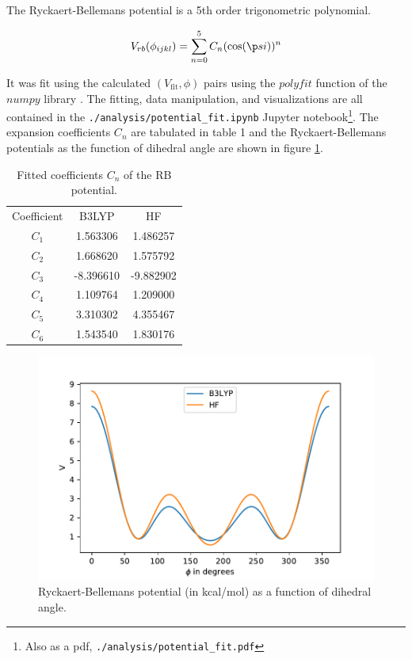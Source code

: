 \documentclass[10pt]{article}
\begin{document}
The Ryckaert-Bellemans potential is a 5th order trigonometric polynomial. 

\begin{align}
V_{rb}(\phi_{ijkl}) = \sum_{n=0}^5 C_n (\cos (\p si))^n
\end{align}

It was fit using the calculated $(V_{\text{fit}}, \phi)$ pairs using the $polyfit$ function of the $numpy$ library \cite{numpy}. The fitting, data manipulation, and visualizations are all contained in the \texttt{./analysis/potential\_fit.ipynb} Jupyter notebook\footnote{Also as a pdf, \texttt{\texttt{./analysis/potential\_fit.pdf}} }. The expansion coefficients $C_n$ are tabulated in table 1 and the Ryckaert-Bellemans  potentials as the function of dihedral angle are shown in figure \ref{fig:v_rb}.

\begin{table}[ht!]
	\centering
	\label{my-label}
	\begin{tabular}{ccc}
		Coefficient & B3LYP  &      HF       \\
		$C_1$ & 1.563306 &  1.486257 \\
		$C_2$ & 1.668620 &  1.575792 \\
		$C_3$ &-8.396610 & -9.882902 \\
		$C_4$ & 1.109764 &  1.209000 \\
		$C_5$ & 3.310302 &  4.355467 \\
		$C_6$ & 1.543540 &  1.830176
	\end{tabular}
	\caption{Fitted coefficients $C_n$ of the RB potential.}
\end{table}

\begin{figure}[th!]
\centering
\includegraphics[width=0.7\linewidth]{fig/v_rb}
\caption{Ryckaert-Bellemans potential (in kcal/mol) as a function of dihedral angle.}
\label{fig:v_rb}
\end{figure}
\end{document}
